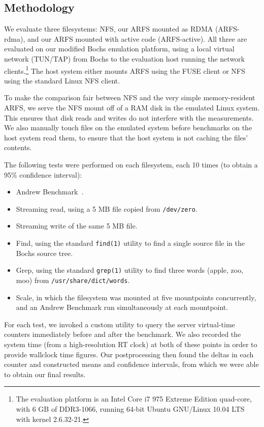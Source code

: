 \documentclass[10pt]{article}
\begin{document}
\subsection{Methodology}

We evaluate three filesystems: NFS, our ARFS mounted as RDMA
(ARFS-rdma), and our ARFS mounted with active code (ARFS-active). All
three are evaluated on our modified Bochs emulation platform, using a
local virtual network (TUN/TAP) from Bochs to the evaluation host
running the network clients.\footnote{The evaluation platform is an
  Intel Core i7 975 Extreme Edition quad-core, with 6 GB of DDR3-1066,
  running 64-bit Ubuntu GNU/Linux 10.04 LTS with kernel 2.6.32-21.}
The host system either mounts ARFS using the FUSE client or NFS using
the standard Linux NFS client.

To make the comparison fair between NFS and the very simple
memory-resident ARFS, we serve the NFS mount off of a RAM disk in the
emulated Linux system. This ensures that disk reads and writes do not
interfere with the measurements. We also manually touch files on the
emulated system before benchmarks on the host system read them, to
ensure that the host system is not caching the files' contents.

The following tests were performed on each filesystem, each 10 times
(to obtain a 95\% confidence interval):

\begin{itemize}
\item Andrew Benchmark~\cite{ab}.
\item Streaming read, using a 5 MB file copied from {\tt /dev/zero}.
\item Streaming write of the same 5 MB file.
\item Find, using the standard {\tt find(1)} utility to find a single source file in the Bochs source tree.
\item Grep, using the standard {\tt grep(1)} utility to find three
  words (apple, zoo, moo) from {\tt /usr/share/dict/words}.
\item Scale, in which the filesystem was mounted at five mountpoints
  concurrently, and an Andrew Benchmark run simultaneously at each
  mountpoint.
\end{itemize}

For each test, we invoked a custom utility to query the server
virtual-time counters immediately before and after the benchmark. We
also recorded the system time (from a high-resolution RT clock) at
both of these points in order to provide wallclock time figures. Our
postprocessing then found the deltas in each counter and constructed
means and confidence intervals, from which we were able to obtain our
final results.
\end{document}
